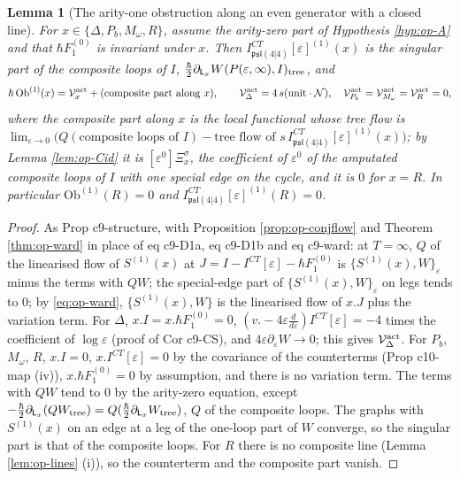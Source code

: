 \documentclass[11pt]{article}
\numberwithin{equation}{section}
\theoremstyle{plain}
\newtheorem{lemma}[theorem]{Lemma}
\theoremstyle{definition}
\newcommand{\psl}{\mathfrak{psl}(4|4)}
\newcommand{\Fc}{\mathcal N}
\newcommand{\Var}{\mathcal V}
\begin{document}
\begin{lemma}[The arity-one obstruction along an even generator with a closed line]
\label{lem:op-obeven}
For $x\in\{\Delta,P_b,M_\omega,R\}$, assume the arity-zero part of Hypothesis \ref{hyp:op-A} and that $\hbar F_1^{(0)}$ is invariant under $x$. Then $I^{CT}_{\psl}[\varepsilon]^{(1)}(x)$ is the singular part of the composite loops of $I$, $\tfrac\hbar2\partial_{\mathsf L_x}W(P(\varepsilon,\infty),I)_{\rm tree}$, and
\[
\hbar\,\mathrm{Ob}^{(1)}(x)=\Var^{\rm act}_x+(\text{composite part along }x),\qquad \Var^{\rm act}_\Delta=4\,s(\text{unit}\cdot\Fc),\quad \Var^{\rm act}_{P_b}=\Var^{\rm act}_{M_\omega}=\Var^{\rm act}_R=0,
\]
where the composite part along $x$ is the local functional whose tree flow is $\lim_{\varepsilon\to0}\big(Q(\text{composite loops of }I)-\text{tree flow of }s\,I^{CT}_{\psl}[\varepsilon]^{(1)}(x)\big)$; by Lemma \ref{lem:op-Cid} it is $[\varepsilon^0]\Xi^\sigma_x$, the coefficient of $\varepsilon^0$ of the amputated composite loops of $I$ with one special edge on the cycle, and it is $0$ for $x=R$. In particular $\mathrm{Ob}^{(1)}(R)=0$ and $I^{CT}_{\psl}[\varepsilon]^{(1)}(R)=0$.
\end{lemma}

\begin{proof}
As Prop c9-structure, with Proposition \ref{prop:op-conjflow} and Theorem \ref{thm:op-ward} in place of eq c9-D1a, eq c9-D1b and eq c9-ward: at $T=\infty$, $Q$ of the linearised flow of $S^{(1)}(x)$ at $J=I-I^{CT}[\varepsilon]-\hbar F_1^{(0)}$ is $\{S^{(1)}(x),W\}_\varepsilon$ minus the terms with $QW$; the special-edge part of $\{S^{(1)}(x),W\}_\varepsilon$ on legs tends to $0$; by \eqref{eq:op-ward}, $\{S^{(1)}(x),W\}$ is the linearised flow of $x.J$ plus the variation term. For $\Delta$, $x.I=x.\hbar F_1^{(0)}=0$, $(v.-4\varepsilon\tfrac d{d\varepsilon})I^{CT}[\varepsilon]=-4$ times the coefficient of $\log\varepsilon$ (proof of Cor c9-CS), and $4\varepsilon\partial_\varepsilon W\to0$; this gives $\Var^{\rm act}_\Delta$. For $P_b$, $M_\omega$, $R$, $x.I=0$, $x.I^{CT}[\varepsilon]=0$ by the covariance of the counterterms (Prop c10-map (iv)), $x.\hbar F_1^{(0)}=0$ by assumption, and there is no variation term. The terms with $QW$ tend to $0$ by the arity-zero equation, except $-\tfrac\hbar2\partial_{\mathsf L_x}(QW_{\rm tree})=Q(\tfrac\hbar2\partial_{\mathsf L_x}W_{\rm tree})$, $Q$ of the composite loops. The graphs with $S^{(1)}(x)$ on an edge at a leg of the one-loop part of $W$ converge, so the singular part is that of the composite loops. For $R$ there is no composite line (Lemma \ref{lem:op-lines} (i)), so the counterterm and the composite part vanish.
\end{proof}
\end{document}
